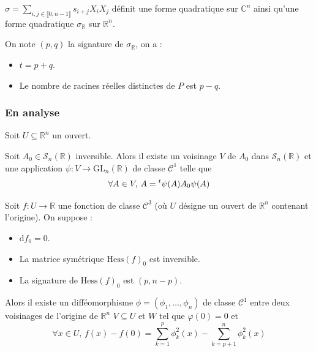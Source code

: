   \begin{proposition}
    $\sigma = \sum_{i, j \in \llbracket 0, n-1 \rrbracket} s_{i+j} X_i X_j$ définit une forme quadratique sur $\mathbb{C}^n$ ainsi qu'une forme quadratique $\sigma_{\mathbb{R}}$ sur $\mathbb{R}^n$.
  \end{proposition}


  \begin{theorem}
    On note $(p,q)$ la signature de $\sigma_{\mathbb{R}}$, on a :
    \begin{itemize}
      \item $t = p + q$.
      \item Le nombre de racines réelles distinctes de $P$ est $p-q$.
    \end{itemize}
  \end{theorem}

  \subsubsection{En analyse}

  Soit $U \subseteq \mathbb{R}^n$ un ouvert.


  \begin{lemma}
    Soit $A_0 \in \mathcal{S}_n(\mathbb{R})$ inversible. Alors il existe un voisinage $V$ de $A_0$ dans $\mathcal{S}_n(\mathbb{R})$ et une application $\psi : V \rightarrow \mathrm{GL}_n(\mathbb{R})$ de classe $\mathcal{C}^1$ telle que
    \[ \forall A \in V, \, A = \mathstrut ^t \psi(A) A_0 \psi(A) \]
  \end{lemma}


  \begin{lemma}
    Soit $f : U \rightarrow \mathbb{R}$ une fonction de classe $\mathcal{C}^3$ (où $U$ désigne un ouvert de $\mathbb{R}^n$ contenant l'origine). On suppose :
    \begin{itemize}
      \item $\mathrm{d} f_0 = 0$.
      \item La matrice symétrique $\mathrm{Hess} (f)_0$ est inversible.
      \item La signature de $\mathrm{Hess}(f)_0$ est $(p, n-p)$.
    \end{itemize}
    Alors il existe un difféomorphisme $\phi = (\phi_1, \dots, \phi_n)$ de classe $\mathcal{C}^1$ entre deux voisinages de l'origine de $\mathbb{R}^n$ $V \subseteq U$ et $W$ tel que $\varphi(0) = 0$ et
    \[ \forall x \in U, \, f(x) - f(0) = \sum_{k=1}^p \phi_k^2(x) - \sum_{k=p+1}^n \phi_k^2(x) \]
  \end{lemma}

